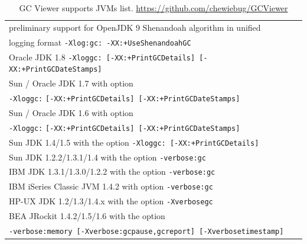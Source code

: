 \documentclass[
  digital, %
  oneside,
  notable, %
  nolof,     %
  nolot     %
]{fithesis3}
\begin{document}
\begin{table}[]
	\centering
	\begin{tabular}{|l|}
		\hline
		preliminary support for OpenJDK 9 Shenandoah algorithm in unified \\ logging format \texttt{-Xlog:gc: -XX:+UseShenandoahGC  }   \\ \hline
		Oracle JDK 1.8 \texttt{-Xloggc: {[}-XX:+PrintGCDetails{]} {[}-XX:+PrintGCDateStamps{]}}                                      \\ \hline
		Sun / Oracle JDK 1.7 with option\\ \texttt{-Xloggc:} \texttt{{[}-XX:+PrintGCDetails{]} {[}-XX:+PrintGCDateStamps{]}}                    \\ \hline
		Sun / Oracle JDK 1.6 with option\\ \texttt{-Xloggc:} \texttt{{[}-XX:+PrintGCDetails{]} {[}-XX:+PrintGCDateStamps{]}}                    \\ \hline
		Sun JDK 1.4/1.5 with the option \texttt{-Xloggc: {[}-XX:+PrintGCDetails{]}}                                                  \\ \hline
		Sun JDK 1.2.2/1.3.1/1.4 with the option \texttt{-verbose:gc}                                                                 \\ \hline
		IBM JDK 1.3.1/1.3.0/1.2.2 with the option \texttt{-verbose:gc}                                                               \\ \hline
		IBM iSeries Classic JVM 1.4.2 with option \texttt{-verbose:gc}                                                               \\ \hline
		HP-UX JDK 1.2/1.3/1.4.x with the option \texttt{-Xverbosegc}                                                                 \\ \hline
		BEA JRockit 1.4.2/1.5/1.6 with the option \\\texttt{-verbose:memory {[}-Xverbose:gcpause,gcreport{]} {[}-Xverbosetimestamp{]}} \\ \hline
	\end{tabular}
	\caption{GC Viewer supports JVMs list. \url{https://github.com/chewiebug/GCViewer}}
	\label{gcviewersupportsjvms}
\end{table}
\end{document}
